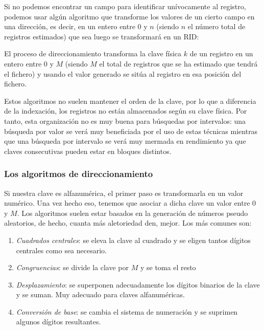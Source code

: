 \documentclass[10pt,a4paper,spanish]{report}
\begin{document}
Si no podemos encontrar un campo para identificar unívocamente al registro, podemos usar algún algoritmo que transforme los valores de un cierto campo en una dirección, es decir, en un entero entre 0 y $n$ (siendo $n$ el número total de registros estimados) que sea luego se transformará en un RID:



El proceso de direccionamiento transforma la clave física $k$ de un registro en un entero entre 0 y $M$ (siendo $M$ el total de registros que se ha estimado que tendrá el fichero) y usando el valor generado se sitúa al registro en esa posición del fichero. 

Estos algoritmos no suelen mantener el orden de la clave, por lo que a diferencia de la indexación, los registros no están almacenados según su clave física. Por tanto, esta organización no es muy buena para búsquedas por intervalos: una búsqueda por valor se verá muy beneficiada por el uso de estas técnicas mientras que una búsqueda por intervalo se verá muy mermada en rendimiento ya que claves consecutivas pueden estar en bloques distintos.

\newpage
\textcolor[rgb]{1,0.2,0.3}{\subsubsection{Los algoritmos de direccionamiento}}
Si nuestra clave es alfanumérica, el primer paso es transformarla en un valor numérico. Una vez hecho eso, tenemos que asociar a dicha clave un valor entre 0 y $M$. Los algoritmos suelen estar basados en la generación de números pseudo aleatorios, de hecho, cuanta más aletoriedad den, mejor. Los más comunes son:

\begin{enumerate}[$\heartsuit$]
    \item \textcolor[rgb]{1,0.2,0.3}{\textit{Cuadrados centrales}}: se eleva la clave al cuadrado y se eligen tantos dígitos centrales como sea necesario.
    \item \textcolor[rgb]{1,0.2,0.3}{\textit{Congruencias}}: se divide la clave por $M$ y se toma el resto
    \item \textcolor[rgb]{1,0.2,0.3}{\textit{Desplazamiento}}: se superponen adecuadamente los dígitos binarios de la clave y se suman. Muy adecuado para claves alfanuméricas.
    \item \textcolor[rgb]{1,0.2,0.3}{\textit{Conversión de base}}: se cambia el sistema de numeración y se suprimen algunos dígitos resultantes.
\end{enumerate}
\end{document}
